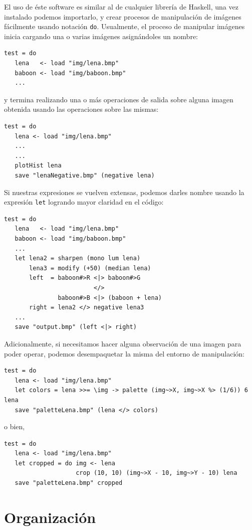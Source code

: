 \documentclass[a4paper, 11pt]{article} %
\begin{document}
	El uso de éste software es similar al de cualquier librería de Haskell, una vez instalado podemos importarlo, y crear procesos de manipulación de imágenes fácilmente usando notación \texttt{do}.
	Usualmente, el proceso de manipular imágenes inicia cargando una o varias imágenes asignándoles un nombre:
\begin{lstlisting}
test = do
   lena   <- load "img/lena.bmp"
   baboon <- load "img/baboon.bmp"
   ...
\end{lstlisting}

\noindent y termina realizando una o más operaciones de salida sobre alguna imagen obtenida usando las operaciones sobre las mismas:
\begin{lstlisting}
test = do
   lena <- load "img/lena.bmp"
   ...
   ...
   plotHist lena
   save "lenaNegative.bmp" (negative lena)
\end{lstlisting}

\noindent Si nuestras expresiones se vuelven extensas, podemos darles nombre usando la expresión \texttt{let} logrando mayor claridad en el código:
\begin{lstlisting}
test = do
   lena   <- load "img/lena.bmp"
   baboon <- load "img/baboon.bmp"
   ...
   let lena2 = sharpen (mono lum lena)
       lena3 = modify (+50) (median lena) 
       left  = baboon#>R <|> baboon#>G
                         </>
               baboon#>B <|> (baboon + lena)
       right = lena2 </> negative lena3
   ...	   		   
   save "output.bmp" (left <|> right)
\end{lstlisting}

\noindent Adicionalmente, si necesitamos hacer alguna observación de una imagen para poder operar, podemos desempaquetar la misma del entorno de manipulación:
\begin{lstlisting}
test = do
   lena <- load "img/lena.bmp"
   let colors = lena >>= \img -> palette (img~>X, img~>X %> (1/6)) 6 lena
   save "paletteLena.bmp" (lena </> colors)
\end{lstlisting}
o bien,
\begin{lstlisting}
test = do
   lena <- load "img/lena.bmp"
   let cropped = do img <- lena  
                    crop (10, 10) (img~>X - 10, img~>Y - 10) lena
   save "paletteLena.bmp" cropped
\end{lstlisting}


\section*{Organización}
\end{document}
